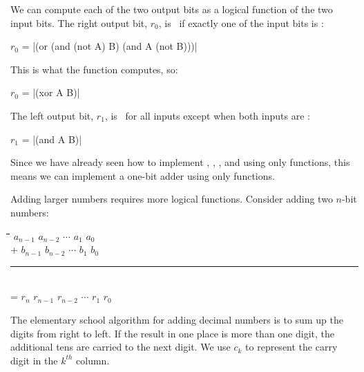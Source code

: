 \begin{schemeregion}
We can compute each of the two output bits as a logical function of the two input bits.  The right output bit, $r_0$, is \bI\ if exactly one of the input bits is \bI:
\begin{center}
$r_0$ = \scheme|(or (and (not A) B) (and A (not B)))|
\end{center}
This is what the  function computes, so:
\begin{center}
$r_0$ = \scheme|(xor A B)|
\end{center}

The left output bit, $r_1$, is \bO\ for all inputs except when both inputs are \bI:
\begin{center}
$r_1$ = \scheme|(and A B)|
\end{center}
Since we have already seen how to implement , , , and  using only  functions, this means we can implement a one-bit adder using only  functions.

Adding larger numbers requires more logical functions.  Consider adding two $n$-bit numbers:
\begin{tabbing} 
\hspace*{2cm}  \= \qquad \= \qquad \= \quad\qquad\= \quad\qquad \= \quad\qquad\= \qquad\=  \kill
               \>       \>       \> $a_{n-1}$  \> $a_{n - 2}$ \> $\cdots$   \> $a_1$ \> $a_0$ \\
               \>  +    \>       \> $b_{n-1}$ \> $b_{n - 2}$ \> $\cdots$ \> $b_1$ \> $b_0$ \\[-0.5ex]
               \>    \> \rule{5.5cm}{0.2mm} \\[0ex]
               \>  =  \> $r_{n}$ \> $r_{n-1}$ \> $r_{n - 2}$ \> $\cdots$ \> $r_1$ \> $r_0$ \\
\end{tabbing}

The elementary school algorithm for adding decimal numbers is to sum up the digits from right to left.  If the result in one place is more than one digit, the additional tens are carried to the next digit.  We use $c_k$ to represent the carry digit in the $k^{th}$ column.



\end{schemeregion}
